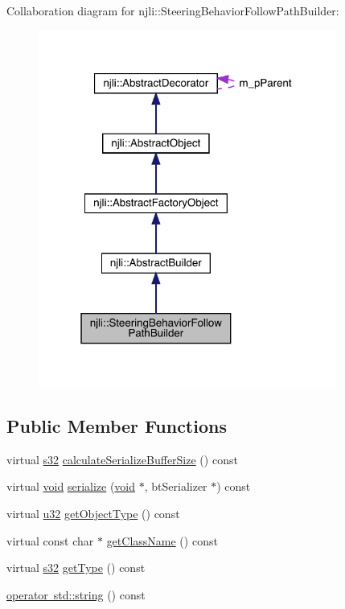 Collaboration diagram for njli\+:\+:Steering\+Behavior\+Follow\+Path\+Builder\+:\nopagebreak
\begin{figure}[H]
\begin{center}
\leavevmode
\includegraphics[width=277pt]{classnjli_1_1_steering_behavior_follow_path_builder__coll__graph}
\end{center}
\end{figure}
\subsection*{Public Member Functions}
\begin{DoxyCompactItemize}
\item 
virtual \mbox{\hyperlink{_util_8h_aa62c75d314a0d1f37f79c4b73b2292e2}{s32}} \mbox{\hyperlink{classnjli_1_1_steering_behavior_follow_path_builder_aba61cd2c8445bf764783323c4e1fa424}{calculate\+Serialize\+Buffer\+Size}} () const
\item 
virtual \mbox{\hyperlink{_thread_8h_af1e856da2e658414cb2456cb6f7ebc66}{void}} \mbox{\hyperlink{classnjli_1_1_steering_behavior_follow_path_builder_a9d6694c1eb17a4e47c0c56b4652b737e}{serialize}} (\mbox{\hyperlink{_thread_8h_af1e856da2e658414cb2456cb6f7ebc66}{void}} $\ast$, bt\+Serializer $\ast$) const
\item 
virtual \mbox{\hyperlink{_util_8h_a10e94b422ef0c20dcdec20d31a1f5049}{u32}} \mbox{\hyperlink{classnjli_1_1_steering_behavior_follow_path_builder_a50a99ba499b7302d16ab1d5f87741222}{get\+Object\+Type}} () const
\item 
virtual const char $\ast$ \mbox{\hyperlink{classnjli_1_1_steering_behavior_follow_path_builder_a019563c150afe91c866de2599de0a06d}{get\+Class\+Name}} () const
\item 
virtual \mbox{\hyperlink{_util_8h_aa62c75d314a0d1f37f79c4b73b2292e2}{s32}} \mbox{\hyperlink{classnjli_1_1_steering_behavior_follow_path_builder_af831b193fb89d58cc9cca762c3590392}{get\+Type}} () const
\item 
\mbox{\hyperlink{classnjli_1_1_steering_behavior_follow_path_builder_a64c00278b66cc5c5b7c67219f97834b2}{operator std\+::string}} () const
\end{DoxyCompactItemize}
